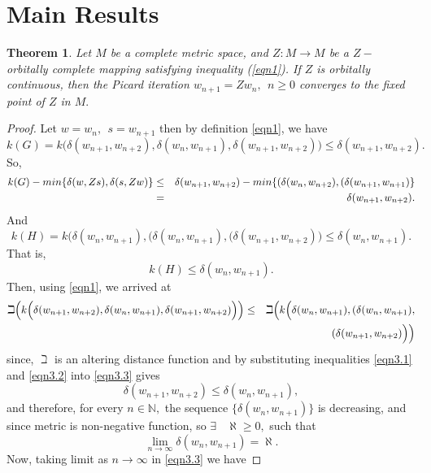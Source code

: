 \documentclass[11pt,reqno]{amsart}
\newtheorem{theorem}{Theorem}[section]
\theoremstyle{definition}
\theoremstyle{remark}
\numberwithin{equation}{section}
\begin{document}
	
	\section{Main Results}
	\begin{theorem}\label{maintheorem}
		Let $M$ be a complete metric space, and $Z: M \to M$ be a $Z-$ orbitally complete mapping satisfying inequality (\ref{eqn1}). If $Z$ is orbitally continuous, then the Picard iteration $w_{n+1} = Zw_n,~~n \geq 0$ converges to the fixed point of $Z$ in $M.$
	\end{theorem}
	\begin{proof}
		Let $w=w_n,~~s=w_{n+1}$ then by definition \ref{eqn1}, we have
		$$k(G)= k\Big(\delta(w_{n+1}, w_{n+2}), \delta(w_n,w_{n+1}), \delta(w_{n+1},w_{n+2})\Big) \leq \delta(w_{n+1}, w_{n+2}).$$
		So,
		\begin{eqnarray}\label{eqn3.1}
			k(G)- min\{\delta(w,Zs), \delta(s,Zw)\}&\leq& \delta(w_{n+1}, w_{n+2})-min\{(\delta(w_n, w_{n+2}),(\delta(w_{n+1}, w_{n+1})\}\notag\\
			&=& \delta(w_{n+1}, w_{n+2}).
		\end{eqnarray}
		And
		\begin{equation}\label{eqn3.2}
			k(H)=k\Big(\delta(w_n, w_{n+1}),(\delta(w_n, w_{n+1}),(\delta(w_{n+1},w_{n+2})\Big) \leq \delta(w_n, w_{n+1}).
		\end{equation}
		That is, 
		$$k(H) \leq\delta(w_n, w_{n+1}).$$
		Then, using \ref{eqn1}, we arrived at
		\begin{eqnarray}\label{eqn3.3}
			\beth \Big(k\Big(\delta(w_{n+1}, w_{n+2}), \delta(w_n,w_{n+1}), \delta(w_{n+1},w_{n+2})\Big)\Big)
			&\leq& \beth \Big(k\Big(\delta(w_n, w_{n+1}),(\delta(w_n, w_{n+1}),\notag\\
			&&(\delta(w_{n+1},w_{n+2})\Big)\Big)
		\end{eqnarray}
		since, $\beth$ is an altering distance function and by substituting inequalities \ref{eqn3.1} and \ref{eqn3.2} into \ref{eqn3.3} gives 
		\begin{equation}\label{eqn3.6}
		\delta(w_{n+1}, w_{n+2}) \leq \delta(w_n, w_{n+1}),
	\end{equation}
		and therefore, for every $n \in \mathbb{N},$ the sequence $\{\delta(w_n, w_{n+1})\}$ is decreasing, and since metric is non-negative function, so $ \exists~~~~ \aleph \geq 0,$ such that
		\begin{equation}\label{eqn3.4}
			\lim_{n \to \infty} \delta(w_{n}, w_{n+1}) = \aleph.
		\end{equation}
		Now, taking limit as $n \to \infty$ in \ref{eqn3.3} we have

\end{proof}
\end{document}
